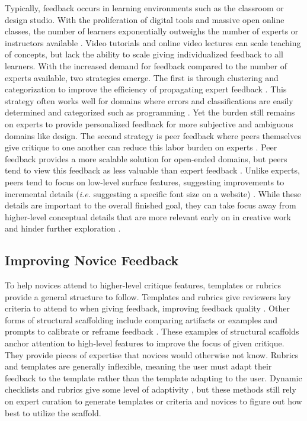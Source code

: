 Typically, feedback occurs in learning environments such as the classroom or design studio. With the proliferation of digital tools and massive open online classes, the number of learners exponentially outweighs the number of experts or instructors available \cite{kay2013moocs,yuan2013moocs}. Video tutorials and online video lectures can scale teaching of concepts, but lack the ability to scale giving individualized feedback to all learners. With the increased demand for feedback compared to the number of experts available, two strategies emerge. The first is through clustering and categorization to improve the efficiency of propagating expert feedback \cite{Brooks2014, Head2017, Kaleeswaran2016, Nguyen2016, Piech2015, Singh2013}. This strategy often works well for domains where errors and classifications are easily determined and categorized such as programming \cite{Hartmann2010, Head2017, Singh2013}. Yet the burden still remains on experts to provide personalized feedback for more subjective and ambiguous domains like design. The second strategy is peer feedback where peers themselves give critique to one another can reduce this labor burden on experts \cite{kulkarni2013peer, sadler2006impact, Topping1998, Tseng2007}. Peer feedback provides a more scalable solution for open-ended domains, but peers tend to view this feedback as less valuable than expert feedback \cite{Cho2006, Gielen2010, Yang2006}. Unlike experts, peers tend to focus on low-level surface features, suggesting improvements to incremental details (\textit{i.e.} suggesting a specific font size on a website) \cite{Greenberg2015, hicks2016framing, Krause2017, yuan2016}. While these details are important to the overall finished goal, they can take focus away from higher-level conceptual details that are more relevant early on in creative work and hinder further exploration \cite{hicks2016framing, kulkarni2013peer, Kulkarni2015, yuan2016}. 

\subsection{Improving Novice Feedback}
To help novices attend to higher-level critique features, templates or rubrics provide a general structure to follow. Templates and rubrics give reviewers key criteria to attend to when giving feedback, improving feedback quality \cite{Attali2004, Bharadwaj, cambre2018juxtapeer, kang2018paragon, Krause2017, Luther2015, yuan2016}. Other forms of structural scaffolding include comparing artifacts or examples \cite{cambre2018juxtapeer, kang2018paragon} and prompts to calibrate or reframe feedback \cite{hicks2016framing,Kulkarni2015}. These examples of structural scaffolds anchor attention to high-level features to improve the focus of given critique. They provide pieces of expertise that novices would otherwise not know. Rubrics and templates are generally inflexible, meaning the user must adapt their feedback to the template rather than the template adapting to the user. Dynamic checklists and rubrics give some level of adaptivity \cite{Bharadwaj}, but these methods still rely on expert curation to generate templates or criteria and novices to figure out how best to utilize the scaffold.


